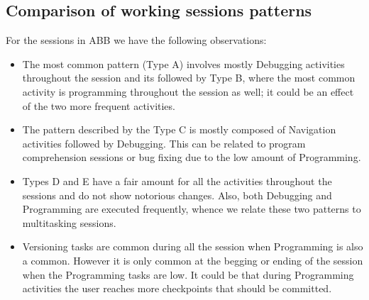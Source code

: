 \subsection{Comparison of working sessions patterns}
For the sessions in ABB we have the following observations:
\begin{itemize}
	\item The most common pattern (Type A) involves mostly Debugging activities throughout the session and its followed by Type B, where the most common activity is programming throughout the session as well; it could be an effect of the two more frequent activities.
	
	\item The pattern described by the Type C is mostly composed of Navigation activities followed by Debugging. This can be related to program comprehension sessions \cite{MMLK14} or bug fixing due to the low amount of Programming.
	
	\item Types D and E have a fair amount for all the activities throughout the sessions and do not show notorious changes. Also, both Debugging and Programming are executed frequently, whence we relate these two patterns to multitasking sessions.
	
	\item Versioning tasks are common during all the session when Programming is also a common. However it is only common at the begging or ending of the session when the Programming tasks are low. It could be that during Programming activities the user reaches more checkpoints that should be committed. 
\end{itemize}

